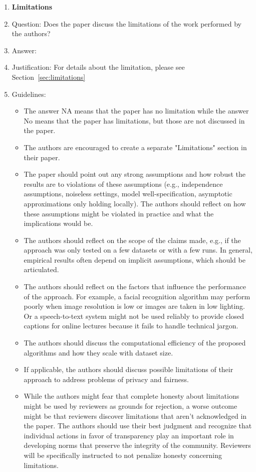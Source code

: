 \begin{enumerate}
\item {\bf Limitations}
    \item[] Question: Does the paper discuss the limitations of the work performed by the authors?
    \item[] Answer: \answerYes{} %
    \item[] Justification: For details about the limitation, please see Section~\ref{sec:limitations} %
    \item[] Guidelines:
    \begin{itemize}
        \item The answer NA means that the paper has no limitation while the answer No means that the paper has limitations, but those are not discussed in the paper. 
        \item The authors are encouraged to create a separate "Limitations" section in their paper.
        \item The paper should point out any strong assumptions and how robust the results are to violations of these assumptions (e.g., independence assumptions, noiseless settings, model well-specification, asymptotic approximations only holding locally). The authors should reflect on how these assumptions might be violated in practice and what the implications would be.
        \item The authors should reflect on the scope of the claims made, e.g., if the approach was only tested on a few datasets or with a few runs. In general, empirical results often depend on implicit assumptions, which should be articulated.
        \item The authors should reflect on the factors that influence the performance of the approach. For example, a facial recognition algorithm may perform poorly when image resolution is low or images are taken in low lighting. Or a speech-to-text system might not be used reliably to provide closed captions for online lectures because it fails to handle technical jargon.
        \item The authors should discuss the computational efficiency of the proposed algorithms and how they scale with dataset size.
        \item If applicable, the authors should discuss possible limitations of their approach to address problems of privacy and fairness.
        \item While the authors might fear that complete honesty about limitations might be used by reviewers as grounds for rejection, a worse outcome might be that reviewers discover limitations that aren't acknowledged in the paper. The authors should use their best judgment and recognize that individual actions in favor of transparency play an important role in developing norms that preserve the integrity of the community. Reviewers will be specifically instructed to not penalize honesty concerning limitations.
    \end{itemize}


\end{enumerate}
